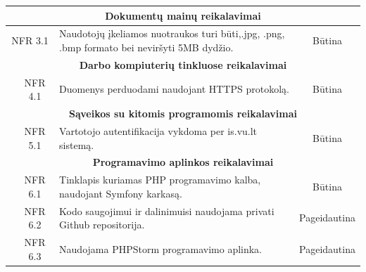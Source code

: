 \documentclass{VUMIFPSkursinis}
\begin{document}
\begin{table}[H]
\begin{tabular}{|p{1cm}|p{1cm}|p{}|p{}|}
		
\hline
\multicolumn{4}{|c|}{\bfseries Dokumentų mainų reikalavimai}\\		
		
	\hline
		\multicolumn{2}{|c|}{NFR 3.1}&
		{Naudotojų įkeliamos nuotraukos turi būti,.jpg, .png, .bmp formato bei neviršyti 5MB dydžio.
		}&
		\multicolumn{1}{c|}{Būtina}\\
		
	\hline
\multicolumn{4}{|c|}{\bfseries Darbo kompiuterių tinkluose reikalavimai}\\		
			
	\hline
		\multicolumn{1}{|c}{}&
		\multicolumn{1}{c|}{NFR 4.1}&
		{Duomenys perduodami naudojant HTTPS protokolą.
		}&
		\multicolumn{1}{c|}{Būtina}\\	
		
	\hline
\multicolumn{4}{|c|}{\bfseries Sąveikos su kitomis programomis reikalavimai}\\	
\hline
		\multicolumn{1}{|c}{}&
		\multicolumn{1}{c|}{NFR 5.1}&
		{Vartotojo autentifikacija vykdoma per is.vu.lt sistemą.
		}&
		\multicolumn{1}{c|}{Būtina}\\
		
	\hline
\multicolumn{4}{|c|}{\bfseries Programavimo aplinkos reikalavimai}\\	
\hline
		\multicolumn{1}{|c}{}&
		\multicolumn{1}{c|}{NFR 6.1}&
		{Tinklapis kuriamas PHP programavimo kalba, naudojant
Symfony karkasą.
		}&
		\multicolumn{1}{c|}{Būtina}\\		

\hline
		\multicolumn{1}{|c}{}&
		\multicolumn{1}{c|}{NFR 6.2}&
		{Kodo saugojimui ir dalinimuisi naudojama privati Github repositorija.
		}&
		\multicolumn{1}{c|}{Pageidautina}\\	
		
\hline
		\multicolumn{1}{|c}{}&
		\multicolumn{1}{c|}{NFR 6.3}&
		{Naudojama PHPStorm programavimo aplinka.
		}&
		\multicolumn{1}{c|}{Pageidautina}\\									

	\hline
	\end{tabular}		
	\end{table}
	
	
\end{document}
